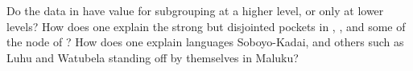 Do the data in  have value for subgrouping at a higher
level, or only at lower levels? How does one explain the strong but
disjointed pockets in ,
, and some of the  node of ? How does one explain 
languages Soboyo-Kadai, and others such as Luhu
and Watubela standing off by themselves in Maluku?